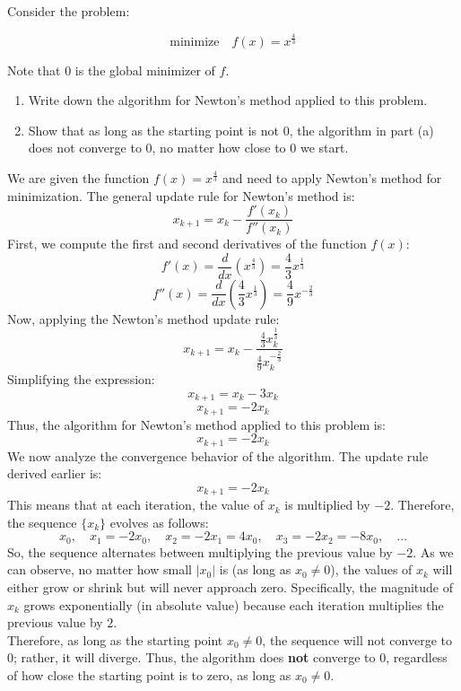 \documentclass{article}
\begin{document}

\begin{question*}[4]
    Consider the problem:

    \[
    \text{minimize} \quad f(x) = x^{\frac{4}{3}}
    \]

    Note that \( 0 \) is the global minimizer of \( f \).

    \begin{enumerate}[label=(\alph*)]
        \item Write down the algorithm for Newton's method applied to this problem.
        
        \item Show that as long as the starting point is not \( 0 \), the algorithm in part (a) does not converge to \( 0 \), no matter how close to \( 0 \) we start.
    \end{enumerate}
\end{question*}

We are given the function \( f(x) = x^{\frac{4}{3}} \) and need to apply Newton's method for minimization. The general update rule for Newton's method is:
\[
x_{k+1} = x_k - \frac{f'(x_k)}{f''(x_k)}
\]
First, we compute the first and second derivatives of the function \( f(x) \):
\[
f'(x) = \frac{d}{dx}\left(x^{\frac{4}{3}}\right) = \frac{4}{3} x^{\frac{1}{3}}
\]
\[
f''(x) = \frac{d}{dx}\left(\frac{4}{3} x^{\frac{1}{3}}\right) = \frac{4}{9} x^{-\frac{2}{3}}
\]
Now, applying the Newton's method update rule:
\[
x_{k+1} = x_k - \frac{\frac{4}{3} x_k^{\frac{1}{3}}}{\frac{4}{9} x_k^{-\frac{2}{3}}}
\]
Simplifying the expression:
\[
x_{k+1} = x_k - 3x_k
\]
\[
x_{k+1} = -2x_k
\]
Thus, the algorithm for Newton's method applied to this problem is:
\[
x_{k+1} = -2x_k
\]
We now analyze the convergence behavior of the algorithm. The update rule derived earlier is:
\[
x_{k+1} = -2x_k
\]
This means that at each iteration, the value of \( x_k \) is multiplied by \(-2\). Therefore, the sequence \( \{x_k\} \) evolves as follows:
\[
x_0, \quad x_1 = -2x_0, \quad x_2 = -2x_1 = 4x_0, \quad x_3 = -2x_2 = -8x_0, \quad \dots
\]
So, the sequence alternates between multiplying the previous value by \(-2\). As we can observe, no matter how small \( |x_0| \) is (as long as \( x_0 \neq 0 \)), the values of \( x_k \) will either grow or shrink but will never approach zero. Specifically, the magnitude of \( x_k \) grows exponentially (in absolute value) because each iteration multiplies the previous value by $2$. \\

Therefore, as long as the starting point \( x_0 \neq 0 \), the sequence will not converge to \( 0 \); rather, it will diverge. Thus, the algorithm does \textbf{not} converge to \( 0 \), regardless of how close the starting point is to zero, as long as \( x_0 \neq 0 \).
\end{document}
